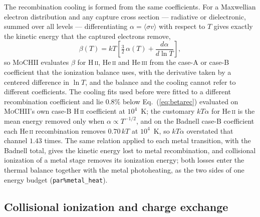 \documentclass[twocolumn,linenumbers]{aastex702}
\newcommand{\code}[1]{\texttt{#1}}
\newcommand{\MoCHII}{\textsc{MoCHII}}
\newcommand{\HII}{H\,\textsc{ii}}
\newcommand{\HeII}{He\,\textsc{ii}}
\newcommand{\HeIII}{He\,\textsc{iii}}
\begin{document}
The recombination cooling is formed from the same coefficients.  For a
Maxwellian electron distribution and any capture cross section ---
radiative or dielectronic, summed over all levels --- differentiating
$\alpha = \langle\sigma v\rangle$ with respect to $T$ gives exactly the
kinetic energy that the captured electrons remove,
\begin{equation}
  \beta(T) = kT\left[\tfrac{3}{2}\,\alpha(T) + \frac{d\alpha}{d\ln T}\right],
  \label{eq:betarec}
\end{equation}%
so \MoCHII{} evaluates $\beta$ for \HII, \HeII{} and \HeIII{} from the
case-A or case-B coefficient that the ionization balance uses, with the
derivative taken by a centered difference in $\ln T$, and the balance and
the cooling cannot refer to different coefficients.  The
\citet{huignedin1997} cooling fits used before were fitted to a different
recombination coefficient and lie $0.8\%$ below Eq.~(\ref{eq:betarec})
evaluated on \MoCHII's own case-B \HII{} coefficient at $10^4$~K; the
customary $kT\alpha$ for \HeII{} is the mean energy removed only when
$\alpha \propto T^{-1/2}$, and on the Badnell case-B coefficient each \HeII{}
recombination removes $0.70\,kT$ at $10^4$~K, so $kT\alpha$ overstated that
channel $1.43$ times.  The same relation applied to each metal transition,
with the Badnell total, gives the kinetic energy lost to metal
recombination, and collisional ionization of a metal stage removes its
ionization energy; both losses enter the thermal balance together with the
metal photoheating, as the two sides of one energy budget
(\code{par\%metal\_heat}).

\subsection{Collisional ionization and charge exchange}
\label{sec:ci}
\end{document}

